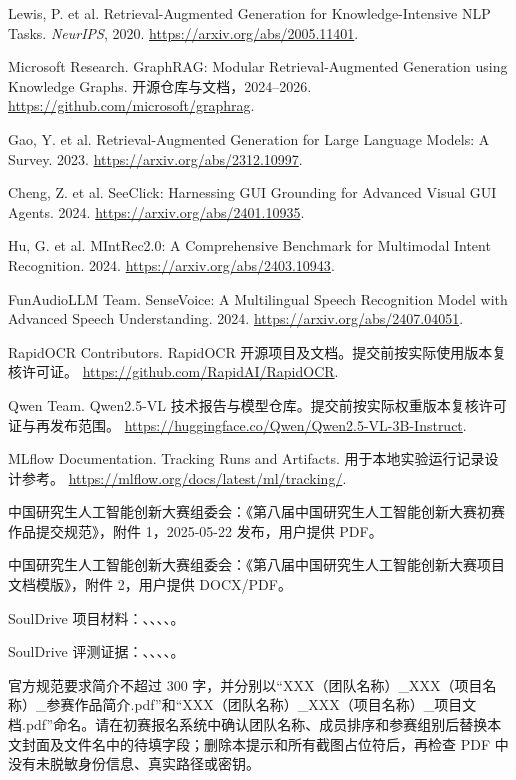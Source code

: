 \documentclass[UTF8,12pt]{ctexart}
\begin{document}
\begin{enumerate}[label={[\arabic*]},leftmargin=2.2em]
  \item Lewis, P. et al. Retrieval-Augmented Generation for Knowledge-Intensive NLP Tasks. \emph{NeurIPS}, 2020. \url{https://arxiv.org/abs/2005.11401}.
  \item Microsoft Research. GraphRAG: Modular Retrieval-Augmented Generation using Knowledge Graphs. 开源仓库与文档，2024--2026. \url{https://github.com/microsoft/graphrag}.
  \item Gao, Y. et al. Retrieval-Augmented Generation for Large Language Models: A Survey. 2023. \url{https://arxiv.org/abs/2312.10997}.
  \item Cheng, Z. et al. SeeClick: Harnessing GUI Grounding for Advanced Visual GUI Agents. 2024. \url{https://arxiv.org/abs/2401.10935}.
  \item Hu, G. et al. MIntRec2.0: A Comprehensive Benchmark for Multimodal Intent Recognition. 2024. \url{https://arxiv.org/abs/2403.10943}.
  \item FunAudioLLM Team. SenseVoice: A Multilingual Speech Recognition Model with Advanced Speech Understanding. 2024. \url{https://arxiv.org/abs/2407.04051}.
  \item RapidOCR Contributors. RapidOCR 开源项目及文档。提交前按实际使用版本复核许可证。 \url{https://github.com/RapidAI/RapidOCR}.
  \item Qwen Team. Qwen2.5-VL 技术报告与模型仓库。提交前按实际权重版本复核许可证与再发布范围。 \url{https://huggingface.co/Qwen/Qwen2.5-VL-3B-Instruct}.
  \item MLflow Documentation. Tracking Runs and Artifacts. 用于本地实验运行记录设计参考。 \url{https://mlflow.org/docs/latest/ml/tracking/}.
  \item 中国研究生人工智能创新大赛组委会：《第八届中国研究生人工智能创新大赛初赛作品提交规范》，附件 1，2025-05-22 发布，用户提供 PDF。
  \item 中国研究生人工智能创新大赛组委会：《第八届中国研究生人工智能创新大赛项目文档模版》，附件 2，用户提供 DOCX/PDF。
  \item SoulDrive 项目材料：、、、、。
  \item SoulDrive 评测证据：、、、、。
\end{enumerate}

\begin{warnbox}[title={最终提交前的合规复核}]
官方规范要求简介不超过 300 字，并分别以“XXX（团队名称）\_XXX（项目名称）\_参赛作品简介.pdf”和“XXX（团队名称）\_XXX（项目名称）\_项目文档.pdf”命名。请在初赛报名系统中确认团队名称、成员排序和参赛组别后替换本文封面及文件名中的待填字段；删除本提示和所有截图占位符后，再检查 PDF 中没有未脱敏身份信息、真实路径或密钥。
\end{warnbox}
\end{document}
